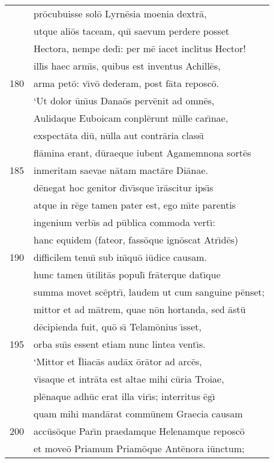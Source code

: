 \documentclass[paper=6in:9in,pagesize=pdftex,
               headinclude=on,footinclude=on,12pt]{scrbook}
\begin{document}
\begin{longtable}[p]{ r l }
 & pr\=ocubuisse sol\=o Lyrn\=esia moenia dextr\=a,\\ 
 & utque ali\=os taceam, qu\={\i} saevum perdere posset\\ 
 & Hectora, nempe ded\={\i}: per m\=e iacet inclitus Hector!\\ 
 & ill\={\i}s haec arm\={\i}s, quibus est inventus Achill\=es,\\ 
180 & arma pet\=o: v\={\i}v\=o dederam, post f\=ata reposc\=o.\\ 
 & \indent `Ut dolor \=un\={\i}us Dana\=os perv\=enit ad omn\=es,\\ 
 & Aulidaque Euboicam conpl\=erunt m\={\i}lle car\={\i}nae,\\ 
 & exspect\=ata di\=u, n\=ulla aut contr\=aria class\={\i}\\ 
 & fl\=amina erant, d\=uraeque iubent Agamemnona sort\=es\\ 
185 & inmeritam saevae n\=atam mact\=are Di\=anae.\\ 
 & d\=enegat hoc genitor d\={\i}v\={\i}sque \={\i}r\=ascitur ips\={\i}s\\ 
 & atque in r\=ege tamen pater est, ego m\={\i}te parentis\\ 
 & ingenium verb\={\i}s ad p\=ublica commoda vert\={\i}:\\ 
 & hanc equidem (fateor, fass\=oque ign\=oscat Atr\={\i}d\=es)\\ 
190 & difficilem tenu\={\i} sub in\={\i}qu\=o i\=udice causam.\\ 
 & hunc tamen \=utilit\=as popul\={\i} fr\=aterque dat\={\i}que\\ 
 & summa movet sc\=eptr\={\i}, laudem ut cum sanguine p\=enset;\\ 
 & mittor et ad m\=atrem, quae n\=on hortanda, sed \=ast\=u\\ 
 & d\=ecipienda fuit, qu\=o s\={\i} Telam\=onius \={\i}sset,\\ 
195 & orba su\={\i}s essent etiam nunc lintea vent\={\i}s.\\ 
 & \indent `Mittor et \=Iliac\=as aud\=ax \=or\=ator ad arc\=es,\\ 
 & v\={\i}saque et intr\=ata est altae mihi c\=uria Troiae,\\ 
 & pl\=enaque adh\=uc erat illa vir\={\i}s; interritus \=eg\={\i}\\ 
 & quam mihi mand\=arat comm\=unem Graecia causam\\ 
200 & acc\=us\=oque Par\={\i}n praedamque Helenamque reposc\=o\\ 
 & et move\=o Priamum Priam\=oque Ant\=enora i\=unctum;\\ 

\end{longtable}
\end{document}

